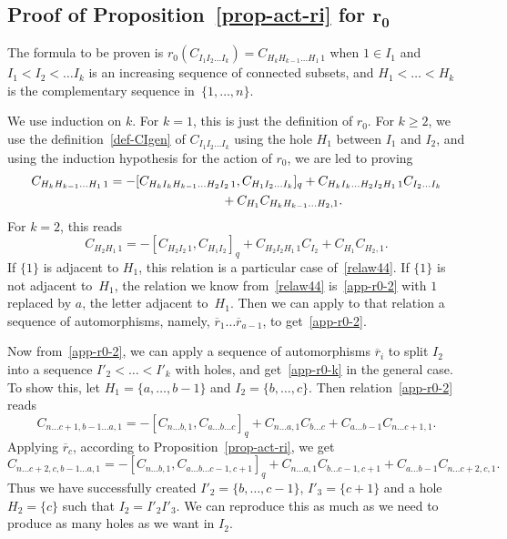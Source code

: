 \documentclass[10pt,a4paper]{amsart}
\numberwithin{equation}{section}
\theoremstyle{definition}
\newcommand{\rb}{\overline{r}}
\begin{document}
\subsection[Proof of Proposition~\ref{prop-act-ri} for r\_0]{Proof of Proposition~\ref{prop-act-ri} for $\boldsymbol{r_0}$}
The formula to be proven is $r_0(C_{I_1I_2\dots I_k})=C_{H_kH_{k-1}\dots H_1\, 1}$ when $1\in I_1$ and $I_1<I_2<\dots I_k$ is an increasing sequence of connected subsets, and $H_1<\dots <H_k$ is the complementary sequence in~$\{1,\dots,n\}$.

We use induction on $k$. For $k=1$, this is just the definition of $r_0$. For $k\geq 2$, we use the definition~\eqref{def-CIgen} of $C_{I_1I_2\dots I_k}$ using the hole $H_1$ between $I_1$ and $I_2$, and using the induction hypothesis for the action of $r_0$, we are led to proving
\begin{gather}\label{app-r0-k}
C_{H_kH_{k-1}\dots H_1\, 1}=-[C_{H_kI_kH_{k-1}\dots H_2I_2\, 1},C_{H_1I_2\dots I_k}]_q+C_{H_kI_k\dots H_2I_2H_1\, 1}C_{I_2\dots I_k}\nonumber\\
\hphantom{C_{H_kH_{k-1}\dots H_1\, 1}=}{} +C_{H_1}C_{H_kH_{k-1}\dots H_2 ,1} .\end{gather}
For $k=2$, this reads
\begin{equation}\label{app-r0-2}
C_{H_2H_1\, 1}=-[C_{H_2I_2\, 1},C_{H_1I_2}]_q+C_{H_2I_2H_1\, 1}C_{I_2}+C_{H_1}C_{H_2 ,1} .
\end{equation}
If $\{1\}$ is adjacent to $H_1$, this relation is a particular case of~\eqref{relaw44}. If $\{1\}$ is not adjacent to~$H_1$, the relation we know from~\eqref{relaw44} is~\eqref{app-r0-2} with $1$ replaced by $a$, the letter adjacent to~$H_1$. Then we can apply to that relation a sequence of automorphisms, namely, $\rb_1\dots \rb_{a-1}$, to get~\eqref{app-r0-2}.

Now from~\eqref{app-r0-2}, we can apply a sequence of automorphisms $\rb_i$ to split $I_2$ into a sequence $I'_2<\dots <I'_k$ with holes, and get~\eqref{app-r0-k} in the general case. To show this, let $H_1=\{a,\dots,b-1\}$ and $I_2=\{b,\dots,c\}$. Then relation~\eqref{app-r0-2} reads
\[C_{n\dots c+1 , b-1\dots a ,1}=-[C_{n\dots b ,1},C_{a\dots b \dots c}]_q+C_{n\dots a , 1}C_{b\dots c}+C_{a\dots b-1}C_{n\dots c+1 ,1} .\]
Applying $\rb_c$, according to Proposition~\ref{prop-act-ri}, we get
\[C_{n\dots c+2 , c , b-1\dots a ,1}=-[C_{n\dots b ,1},C_{a\dots b \dots c-1 ,c+1}]_q+C_{n\dots a , 1}C_{b\dots c-1 ,c+1}+C_{a\dots b-1}C_{n\dots c+2 ,c ,1} .\]
Thus we have successfully created $I'_2=\{b,\dots,c-1\}$, $I'_3=\{c+1\}$ and a hole $H_2=\{c\}$ such that $I_2=I'_2I'_3$. We can reproduce this as much as we need to produce as many holes as we want in $I_2$.
\end{document}
